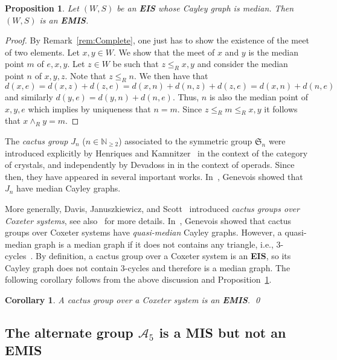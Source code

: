 \documentclass[A4paper, oneside]{amsart}
\newcommand{\id}{\textit{e}}
\newcommand{\EIS}{\textnormal{\bf EIS}\xspace}
\newcommand{\EMIS}{\textnormal{\bf EMIS}\xspace}
\newcommand{\MIS}{\textnormal{\bf MIS}\xspace}
\newtheorem{cor}[thm]{Corollary}
\newtheorem{prop}[thm]{Proposition}
\theoremstyle{definition}
\begin{document}
\begin{prop} \label{Median}
    Let $(W,S)$ be an \EIS whose Cayley graph is median. Then $(W,S)$ is an \EMIS. 
\end{prop}
\begin{proof} 
	By Remark~\ref{rem:Complete}, one just has to show the existence of the meet of two elements. Let $x,y \in W$. We show that the meet of $x$ and $y$ is the median point $m$ of $\id, x, y$. Let $z \in W$ be such that $z\leq_R x,y$ and consider the median point $n$ of $x,y,z$. Note that $z \leq_R n$. We then have that
	\begin{equation*}
        d(x,\id) =  d(x,z)+d(z,\id) = d(x,n) + d(n,z)+d(z,\id) = d(x,n)+ d(n,\id)
    \end{equation*}
    and similarly $d(y,\id) = d(y,n)+ d(n,\id)$. Thus, $n$ is also the median point of $x,y,\id$ which implies by uniqueness that $n=m$. Since $z \leq_R m \leq_R x,y$ it follows that $x \wedge_R y = m$. 
\end{proof}


The {\em cactus group} $J_n$ ($n\in\mathbb N_{\geq 2}$) associated to the symmetric group $\mathfrak S_n$  were introduced explicitly by Henriques and Kamnitzer~\cite{HeKa06} in the context of the category of crystals, and independently by Devadoss in \cite{Devadoss} in the context of operads. Since then, they have appeared in several important works. In~\cite{genevois2022cactus}, Genevois showed that  $J_n$ have median Cayley graphs.

More generally, Davis, Januszkiewicz, and Scott~\cite[\S4.7]{BlowUps} introduced {\em cactus groups over Coxeter systems}, see also~\cite{Go25} for more details.   In~\cite{Ge25}, Genevois showed that cactus groups over Coxeter systems have {\em quasi-median} Cayley graphs. However, a quasi-median graph is a median graph if it does not contains any triangle, i.e., $3$-cycles~\cite[Theorem~4.2]{Ge25}. By definition, a cactus group over a Coxeter system is an \EIS, so its Cayley graph does not contain $3$-cycles and therefore is a median graph. The following corollary follows from the above discussion and Proposition~\ref{Median}.


\begin{cor}
\label{cor:Cactus}
A cactus group over a Coxeter system is an \EMIS.
\qed
\end{cor}


\subsection{The alternate group $\mathcal A_5$ is a \MIS but not an \EMIS}
\label{ss:Alt5}
\def\Ss{\mathfrak S}
\end{document}
